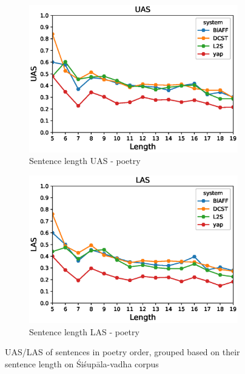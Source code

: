 \documentclass[11pt]{article}
\begin{document}
\begin{figure}[!ht]
        \centering
        \begin{subfigure}[b]{0.475\textwidth}
            \centering
            \includegraphics[width=\textwidth]{images/poetryUASLength.eps}
            \caption[Network2]%
            {{\small Sentence length UAS - poetry}}    
            
        \end{subfigure}
        \hfill
        \begin{subfigure}[b]{0.475\textwidth}  
            \centering 
            \includegraphics[width=\textwidth]{images/poetryLASLength.eps}
            \caption[]%
            {{\small Sentence length LAS - poetry}}    
            
        \end{subfigure}

        \caption[ UAS/LAS of sentences in poetry order, grouped based on their sentence length on Śiśupāla-vadha corpus  ]
        {\small UAS/LAS of sentences in poetry order, grouped based on their sentence length on Śiśupāla-vadha corpus  } 
        \label{sentLenpoetry}
    \end{figure} 
    
\end{document}
